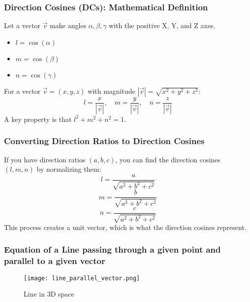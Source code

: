 \begin{frame}
    \frametitle{Direction Cosines (DCs): Mathematical Definition}
    Let a vector \(\vec{v}\) make angles \(\alpha, \beta, \gamma\) with the positive X, Y, and Z axes.
    \begin{itemize}
        \item \(l = \cos(\alpha)\)
        \item \(m = \cos(\beta)\)
        \item \(n = \cos(\gamma)\)
    \end{itemize}

    For a vector \(\vec{v} = (x, y, z)\) with magnitude \(|\vec{v}| = \sqrt{x^2 + y^2 + z^2}\):
    \[ l = \frac{x}{|\vec{v}|}, \quad m = \frac{y}{|\vec{v}|}, \quad n = \frac{z}{|\vec{v}|} \]
    A key property is that \(l^2 + m^2 + n^2 = 1\).
\end{frame}

\begin{frame}
    \frametitle{Converting Direction Ratios to Direction Cosines}
    If you have direction ratios \((a, b, c)\), you can find the direction cosines \((l, m, n)\) by normalizing them:
    \[ l = \frac{a}{\sqrt{a^2 + b^2 + c^2}} \]
    \[ m = \frac{b}{\sqrt{a^2 + b^2 + c^2}} \]
    \[ n = \frac{c}{\sqrt{a^2 + b^2 + c^2}} \]
    This process creates a unit vector, which is what the direction cosines represent.
\end{frame}


\begin{frame}
    \frametitle{Equation of a Line passing through a given point and parallel to a given vector}
    \begin{figure}
        \texttt{[image: line\_parallel\_vector.png]}
        \caption{Line in 3D space}
    \end{figure}
\end{frame}


